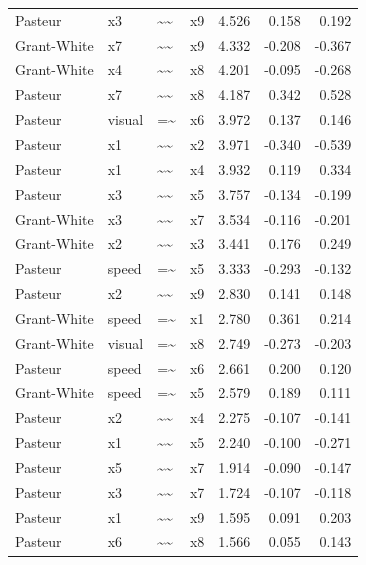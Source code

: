 \documentclass[11pt]{article}
\begin{document}
\begin{longtable}{llllrrr}
Pasteur & x3 & \textasciitilde{}\textasciitilde{} & x9 & 4.526 & 0.158 & 0.192 \\
Grant-White & x7 & \textasciitilde{}\textasciitilde{} & x9 & 4.332 & -0.208 & -0.367 \\
Grant-White & x4 & \textasciitilde{}\textasciitilde{} & x8 & 4.201 & -0.095 & -0.268 \\
Pasteur & x7 & \textasciitilde{}\textasciitilde{} & x8 & 4.187 & 0.342 & 0.528 \\
Pasteur & visual & =\textasciitilde{} & x6 & 3.972 & 0.137 & 0.146 \\
Pasteur & x1 & \textasciitilde{}\textasciitilde{} & x2 & 3.971 & -0.340 & -0.539 \\
Pasteur & x1 & \textasciitilde{}\textasciitilde{} & x4 & 3.932 & 0.119 & 0.334 \\
Pasteur & x3 & \textasciitilde{}\textasciitilde{} & x5 & 3.757 & -0.134 & -0.199 \\
Grant-White & x3 & \textasciitilde{}\textasciitilde{} & x7 & 3.534 & -0.116 & -0.201 \\
Grant-White & x2 & \textasciitilde{}\textasciitilde{} & x3 & 3.441 & 0.176 & 0.249 \\
Pasteur & speed & =\textasciitilde{} & x5 & 3.333 & -0.293 & -0.132 \\
Pasteur & x2 & \textasciitilde{}\textasciitilde{} & x9 & 2.830 & 0.141 & 0.148 \\
Grant-White & speed & =\textasciitilde{} & x1 & 2.780 & 0.361 & 0.214 \\
Grant-White & visual & =\textasciitilde{} & x8 & 2.749 & -0.273 & -0.203 \\
Pasteur & speed & =\textasciitilde{} & x6 & 2.661 & 0.200 & 0.120 \\
Grant-White & speed & =\textasciitilde{} & x5 & 2.579 & 0.189 & 0.111 \\
Pasteur & x2 & \textasciitilde{}\textasciitilde{} & x4 & 2.275 & -0.107 & -0.141 \\
Pasteur & x1 & \textasciitilde{}\textasciitilde{} & x5 & 2.240 & -0.100 & -0.271 \\
Pasteur & x5 & \textasciitilde{}\textasciitilde{} & x7 & 1.914 & -0.090 & -0.147 \\
Pasteur & x3 & \textasciitilde{}\textasciitilde{} & x7 & 1.724 & -0.107 & -0.118 \\
Pasteur & x1 & \textasciitilde{}\textasciitilde{} & x9 & 1.595 & 0.091 & 0.203 \\
Pasteur & x6 & \textasciitilde{}\textasciitilde{} & x8 & 1.566 & 0.055 & 0.143 \\

\end{longtable}
\end{document}
